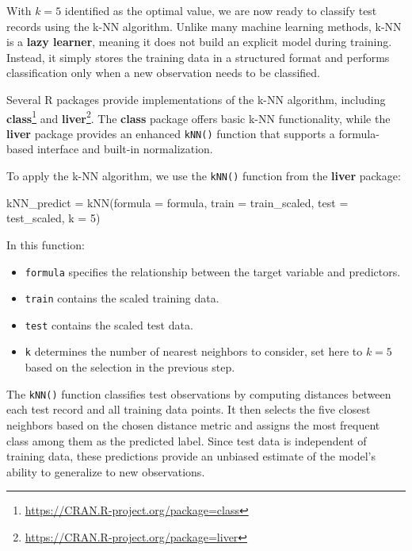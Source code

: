\documentclass[
  11pt,
]{book}
\makeatletter
\newenvironment{Shaded}{}{}
\newcommand{\AttributeTok}[1]{#1}
\newcommand{\DecValTok}[1]{#1}
\newcommand{\FunctionTok}[1]{#1}
\newcommand{\NormalTok}[1]{#1}
\newcommand{\OtherTok}[1]{\textcolor[rgb]{0.39,0.39,0.39}{#1}}
\providecommand{\tightlist}{%
  \setlength{\itemsep}{0pt}\setlength{\parskip}{0pt}}
\renewcommand{\href}[2]{#2\footnote{\url{#1}}}
\newenvironment{kframe}{%
\medskip{}
\setlength{\fboxsep}{.8em}
 \def\at@end@of@kframe{}%
 \ifinner\ifhmode%
  \def\at@end@of@kframe{\end{minipage}}%
  \begin{minipage}{\columnwidth}%
 \fi\fi%
 \def\FrameCommand##1{\hskip\@totalleftmargin \hskip-\fboxsep
 \colorbox{shadecolor}{##1}\hskip-\fboxsep
     \hskip-\linewidth \hskip-\@totalleftmargin \hskip\columnwidth}%
 \MakeFramed {\advance\hsize-\width
   \@totalleftmargin\z@ \linewidth\hsize
   \@setminipage}}%
 {\par\unskip\endMakeFramed%
 \at@end@of@kframe}
\renewenvironment{Shaded}{\begin{kframe}}{\end{kframe}}
\theoremstyle{definition}
\theoremstyle{definition}
\theoremstyle{definition}
\theoremstyle{definition}
\theoremstyle{remark}
\makeatother
\begin{document}
With \(k = 5\) identified as the optimal value, we are now ready to classify test records using the k-NN algorithm. Unlike many machine learning methods, k-NN is a \textbf{lazy learner}, meaning it does not build an explicit model during training. Instead, it simply stores the training data in a structured format and performs classification only when a new observation needs to be classified.

Several R packages provide implementations of the k-NN algorithm, including \href{https://CRAN.R-project.org/package=class}{\textbf{class}} and \href{https://CRAN.R-project.org/package=liver}{\textbf{liver}}. The \textbf{class} package offers basic k-NN functionality, while the \textbf{liver} package provides an enhanced \texttt{kNN()} function that supports a formula-based interface and built-in normalization.

To apply the k-NN algorithm, we use the \texttt{kNN()} function from the \textbf{liver} package:

\begin{Shaded}
\begin{Highlighting}[]
\NormalTok{kNN\_predict }\OtherTok{=} \FunctionTok{kNN}\NormalTok{(}\AttributeTok{formula =}\NormalTok{ formula, }\AttributeTok{train =}\NormalTok{ train\_scaled, }\AttributeTok{test =}\NormalTok{ test\_scaled, }\AttributeTok{k =} \DecValTok{5}\NormalTok{)}
\end{Highlighting}
\end{Shaded}

In this function:

\begin{itemize}
\tightlist
\item
  \texttt{formula} specifies the relationship between the target variable and predictors.\\
\item
  \texttt{train} contains the scaled training data.\\
\item
  \texttt{test} contains the scaled test data.\\
\item
  \texttt{k} determines the number of nearest neighbors to consider, set here to \(k = 5\) based on the selection in the previous step.
\end{itemize}

The \texttt{kNN()} function classifies test observations by computing distances between each test record and all training data points. It then selects the five closest neighbors based on the chosen distance metric and assigns the most frequent class among them as the predicted label. Since test data is independent of training data, these predictions provide an unbiased estimate of the model's ability to generalize to new observations.
\end{document}
